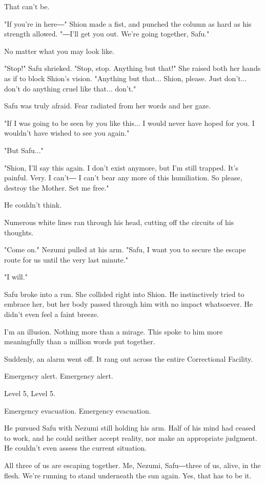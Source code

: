 That can't be.

"If you're in here―" Shion made a fist, and punched the column as hard
as his strength allowed. "―I'll get you out. We're going together,
Safu."

No matter what you may look like.

"Stop!" Safu shrieked. "Stop, stop. Anything but that!" She raised both
her hands as if to block Shion's vision. "Anything but that... Shion,
please. Just don't... don't do anything cruel like that... don't."

Safu was truly afraid. Fear radiated from her words and her gaze.

"If I was going to be seen by you like this... I would never have hoped
for you. I wouldn't have wished to see you again."

"But Safu..."

"Shion, I'll say this again. I don't exist anymore, but I'm still
trapped. It's painful. Very. I can't― I can't bear any more of this
humiliation. So please, destroy the Mother. Set me free."

He couldn't think.

Numerous white lines ran through his head, cutting off the circuits of
his thoughts.

"Come on." Nezumi pulled at his arm. "Safu, I want you to secure the
escape route for us until the very last minute."

"I will."

Safu broke into a run. She collided right into Shion. He instinctively
tried to embrace her, but her body passed through him with no impact
whatsoever. He didn't even feel a faint breeze.

I'm an illusion. Nothing more than a mirage. This spoke to him more
meaningfully than a million words put together.

Suddenly, an alarm went off. It rang out across the entire Correctional
Facility.

Emergency alert. Emergency alert.

Level 5, Level 5.

Emergency evacuation. Emergency evacuation.

He pursued Safu with Nezumi still holding his arm. Half of his mind had
ceased to work, and he could neither accept reality, nor make an
appropriate judgment. He couldn't even assess the current situation.

All three of us are escaping together. Me, Nezumi, Safu―three of us,
alive, in the flesh. We're running to stand underneath the sun again.
Yes, that has to be it.

